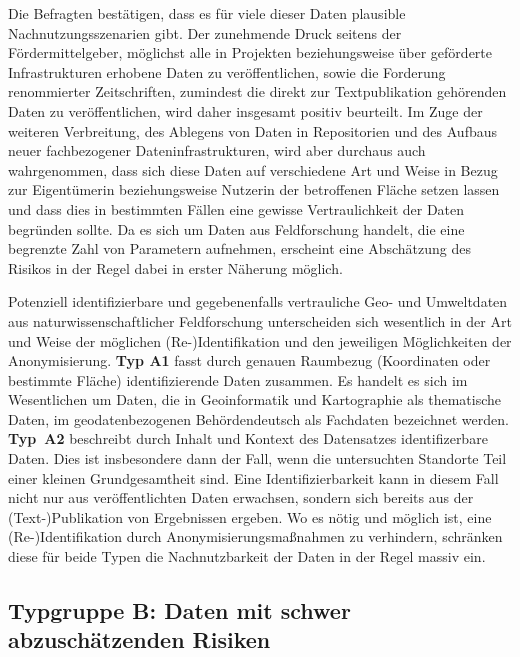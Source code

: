 \documentclass[a4paper,
fontsize=11pt,
oneside,
numbers=noperiodatend,
parskip=half-,
bibliography=totoc,
final
]{scrartcl}
\begin{document}
Die Befragten bestätigen, dass es für viele dieser Daten plausible
Nachnutzungsszenarien gibt. Der zunehmende Druck seitens der
Fördermittelgeber, möglichst alle in Projekten beziehungsweise über
geförderte Infrastrukturen erhobene Daten zu veröffentlichen, sowie die
Forderung renommierter Zeitschriften, zumindest die direkt zur
Textpublikation gehörenden Daten zu veröffentlichen, wird daher
insgesamt positiv beurteilt. Im Zuge der weiteren Verbreitung, des
Ablegens von Daten in Repositorien und des Aufbaus neuer fachbezogener
Dateninfrastrukturen, wird aber durchaus auch wahrgenommen, dass sich
diese Daten auf verschiedene Art und Weise in Bezug zur Eigentümerin
beziehungsweise Nutzerin der betroffenen Fläche setzen lassen und dass
dies in bestimmten Fällen eine gewisse Vertraulichkeit der Daten
begründen sollte. Da es sich um Daten aus Feldforschung handelt, die
eine begrenzte Zahl von Parametern aufnehmen, erscheint eine Abschätzung
des Risikos in der Regel dabei in erster Näherung möglich.

Potenziell identifizierbare und gegebenenfalls vertrauliche Geo- und
Umweltdaten aus naturwissenschaftlicher Feldforschung unterscheiden sich
wesentlich in der Art und Weise der möglichen (Re-)Identifikation und
den jeweiligen Möglichkeiten der Anonymisierung. \textbf{Typ A1} fasst
durch genauen Raumbezug (Koordinaten oder bestimmte Fläche)
identifizierende Daten zusammen. Es handelt es sich im Wesentlichen um
Daten, die in Geoinformatik und Kartographie als thematische Daten, im
geodatenbezogenen Behördendeutsch als Fachdaten bezeichnet werden.
\textbf{Typ~A2} beschreibt durch Inhalt und Kontext des Datensatzes
identifizerbare Daten. Dies ist insbesondere dann der Fall, wenn die
untersuchten Standorte Teil einer kleinen Grundgesamtheit sind. Eine
Identifizierbarkeit kann in diesem Fall nicht nur aus veröffentlichten
Daten erwachsen, sondern sich bereits aus der (Text-)Publikation von
Ergebnissen ergeben. Wo es nötig und möglich ist, eine
(Re-)Identifikation durch Anonymisierungsmaßnahmen zu verhindern,
schränken diese für beide Typen die Nachnutzbarkeit der Daten in der
Regel massiv ein.

\hypertarget{typgruppe-b-daten-mit-schwer-abzuschuxe4tzenden-risiken}{%
\subsection{Typgruppe B: Daten mit schwer abzuschätzenden Risiken}\label{typgruppe-b-daten-mit-schwer-abzuschuxe4tzenden-risiken}}
\end{document}
